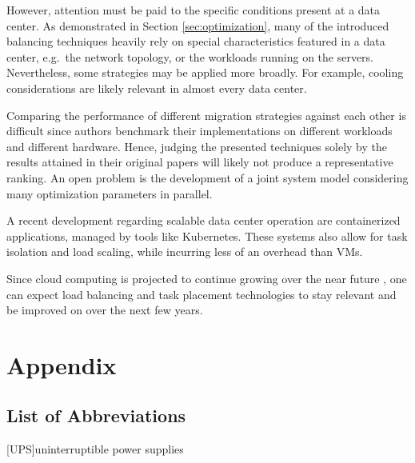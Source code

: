 \documentclass[12pt, a4paper]{scrartcl}
\begin{document}
However, attention must be paid to the specific conditions present at a data center.
As demonstrated in Section \ref{sec:optimization}, many of the introduced balancing techniques heavily rely on special characteristics featured in a data center, e.g.\ the network topology, or the workloads running on the servers.
Nevertheless, some strategies may be applied more broadly.
For example, cooling considerations are likely relevant in almost every data center.

Comparing the performance of different migration strategies against each other is difficult since authors benchmark their implementations on different workloads and different hardware.
Hence, judging the presented techniques solely by the results attained in their original papers will likely not produce a representative ranking.  
An open problem is the development of a joint system model considering many optimization parameters in parallel.

A recent development regarding scalable data center operation are containerized applications, managed by tools like Kubernetes.
These systems also allow for task isolation and load scaling, while incurring less of an overhead than \acp{VM}.

Since cloud computing is projected to continue growing over the near future \cite{iea_analysis_2019}, one can expect load balancing and task placement technologies to stay relevant and be improved on over the next few years.


\clearpage
\section*{Appendix}
\subsection*{List of Abbreviations}
\begin{acronym}[LONG]
[UPS]{uninterruptible power supplies}
\end{acronym}

\printbibliography
\end{document}
